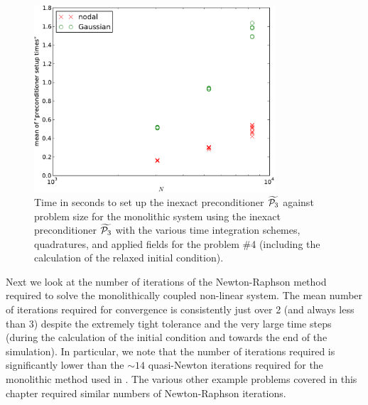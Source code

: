 \begin{figure}
  \centering
  \includegraphics[width=0.8\textwidth]
  {plots/mumag4_monolithic_its/meanofpreconditionersetuptimesvsinitialnnode.pdf}
  \caption{
    Time in seconds to set up the inexact preconditioner $\widetilde{\mathcal{P}_3}$
    against problem size for the monolithic system using the inexact preconditioner $\widetilde{\mathcal{P}_3}$
    with the various time integration schemes, quadratures, and applied fields
    for the \mumag problem \#4 (including the calculation of the relaxed initial condition).
  }
  \label{fig:mumag4-solver-time}
\end{figure}


Next we look at the number of iterations of the Newton-Raphson method required to solve the monolithically coupled non-linear system.
The mean number of iterations required for convergence is consistently just over 2 (and always less than 3) despite the extremely tight tolerance and the very large time steps (during the calculation of the initial condition and towards the end of the simulation).
In particular, we note that the number of iterations required is significantly lower than the $\sim 14$ quasi-Newton iterations required for the monolithic method used in \cite{DAquino2005}.
The various other example problems covered in this chapter required similar numbers of Newton-Raphson iterations.

